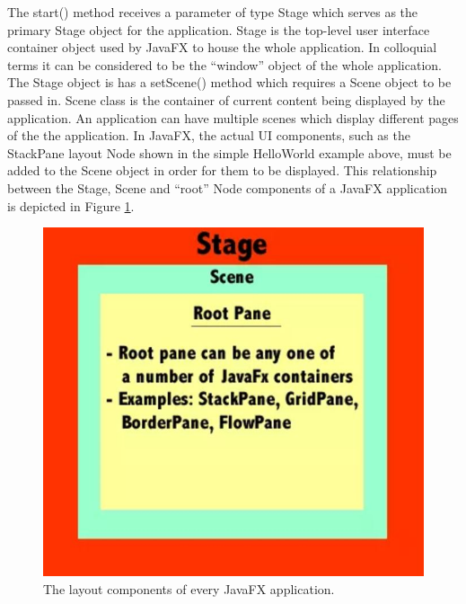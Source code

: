 The start() method receives a parameter of type Stage which serves as the primary Stage object for the application. Stage is the top-level user interface container object used by JavaFX to house the whole application. In colloquial terms it can be considered to be the “window” object of the whole application. The Stage object is has a setScene() method which requires a Scene object to be passed in. Scene class is the container of current content being displayed by the application. An application can have multiple scenes which display different pages of the the application. In JavaFX, the actual UI components, such as the StackPane layout Node shown in the simple HelloWorld example above, must be added to the Scene object in order for them to be displayed. This relationship between the Stage, Scene and “root” Node components of a JavaFX application is depicted in Figure \ref{fig:stageSceneRoot}.
\begin{figure}[th]
\centering
\includegraphics[scale=0.5]{Figures/stageSceneRoot.JPG}
\caption[UI Layout]{The layout components of every JavaFX application.}
\label{fig:stageSceneRoot}
\end{figure}

